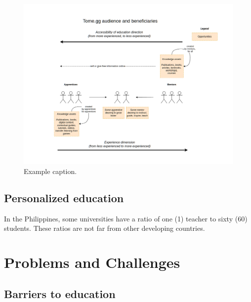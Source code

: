 \documentclass[journal, onecolumn]{IEEEtran}
\newcommand{\tomegg}{
  \href{http://tome.gg}{Tome.gg}
}
\begin{document}


\begin{figure}[t]
  \centering
  \includegraphics[width=\textwidth]{00-tomegg-actors.png}
  \caption{Example caption.}
  \label{fig:example}
\end{figure}

\subsection{Personalized education}

In the Philippines, some universities have a ratio of one (1) teacher to sixty (60)
students. These ratios are not far from other developing countries.

\section{Problems and Challenges} 
\label{sec:problems_challenges}

\subsection{Barriers to education}
\end{document}
